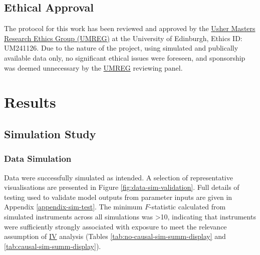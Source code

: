 \documentclass[
]{article}
\begin{document}
\subsection{Ethical Approval}\label{ethical-approval}

The protocol for this work has been reviewed and approved by the \hyperref[acronyms_UMREG]{Usher Masters Research Ethics Group (UMREG)} at the University of Edinburgh, Ethics ID: UM241126. Due to the nature of the project, using simulated and publically available data only, no significant ethical issues were foreseen, and sponsorship was deemed unnecessary by the \hyperref[acronyms_UMREG]{UMREG} reviewing panel.

\section{Results}\label{results-1}

\subsection{Simulation Study}\label{simulation-study-1}

\subsubsection{Data Simulation}\label{data-simulation-1}

Data were successfully simulated as intended. A selection of representative visualisations are presented in Figure \ref{fig:data-sim-validation}. Full details of testing used to validate model outputs from parameter inputs are given in Appendix \ref{appendix-sim-test}. The minimum \(F\)-statistic calculated from simulated instruments across all simulations was \textgreater10, indicating that instruments were sufficiently strongly associated with exposure to meet the relevance assumption of \hyperref[acronyms_IV]{IV} analysis (Tables \ref{tab:no-causal-sim-summ-display} and \ref{tab:causal-sim-summ-display}).
\end{document}

